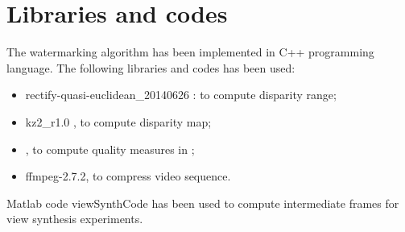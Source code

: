 \appendix
\chapter{Libraries and codes}

The watermarking algorithm has been implemented in C++ programming language. The following libraries and codes has been used:
\begin{itemize}
\item rectify-quasi-euclidean\_20140626 \cite{}: to compute disparity range;
\item kz2\_r1.0 \cite{}, to compute disparity map;
\item  \cite{}, to compute quality measures in \cite{};
\item ffmpeg-2.7.2, to compress video sequence.
\end{itemize}

Matlab code viewSynthCode \cite{} has been used to compute intermediate frames for view synthesis experiments.
 